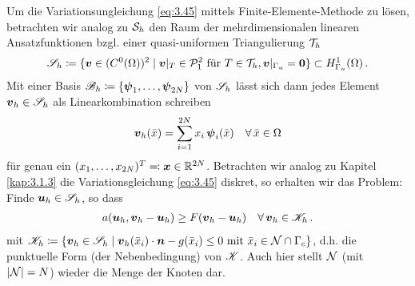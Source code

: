 Um die Variationsungleichung \eqref{eq:3.45} mittels Finite-Elemente-Methode zu lösen, betrachten wir analog zu $\mathcal S_h$ den Raum der mehrdimensionalen linearen  Ansatzfunktionen bzgl. einer quasi-uniformen Triangulierung $\mathcal T_h$
\begin{align}\label{eq:3.53}
	 \mathscr S_h \coloneqq \{\boldsymbol v \in (C^0(\Omega))^2 \mid \boldsymbol v|_T \in \mathcal P_1^2 \text{ für } T \in \mathcal T_h, \boldsymbol v|_{\Gamma_u} = \boldsymbol 0\} \subset H^1_{\Gamma_u} (\Omega)\, .
\end{align}
Mit einer Basis $\mathscr B_h \coloneqq \{\boldsymbol\psi_1,\ldots,\boldsymbol \psi_{2N}\}$ von $\mathscr S_h$ lässt sich dann jedes Element $\boldsymbol v_h \in \mathscr S_h$ als Linearkombination schreiben
\begin{align}\label{eq:3.54}
	\boldsymbol v_h(\bar x) = \sum_{i = 1}^{2N} x_i \, \boldsymbol \psi_i(\bar x) \quad \forall \, \bar x \in \Omega
\end{align}
für genau ein $(x_1,\ldots,x_{2N})^T \eqqcolon \boldsymbol x \in \mathbb{R}^{2N}$. Betrachten wir analog zu Kapitel \ref{kap:3.1.3} die Variationsgleichung \eqref{eq:3.45} diskret, so erhalten wir das Problem: Finde $\boldsymbol u_h \in \mathscr S_h$, so dass
\begin{align}\label{eq:3.55}
	a(\boldsymbol u_h, \boldsymbol v_h - \boldsymbol u_h) \ge F(\boldsymbol v_h- \boldsymbol u_h) \quad \forall \, \boldsymbol v_h \in \mathscr K_h \, .
\end{align}
mit $\mathscr K_h \coloneqq \{  \boldsymbol v_h \in \mathscr S_h \mid \boldsymbol v_h(\bar x_i) \cdot \boldsymbol n - g(\bar x_i) \le 0 \text{ mit } \bar x_i \in \mathcal N \cap \Gamma_c\}$, d.h. die punktuelle Form (der Nebenbedingung) von $\mathscr K$. Auch hier stellt $\mathcal N$ (mit $\lvert \mathcal N\rvert = N$) wieder die Menge der Knoten dar.

